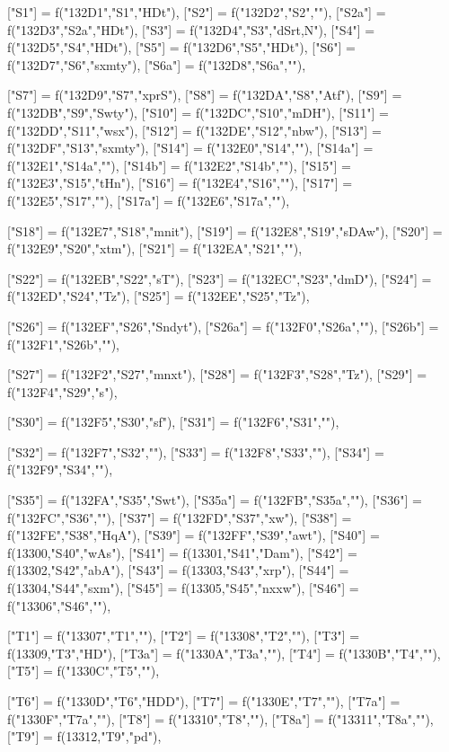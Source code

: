 \documentclass{article}
\begin{document}
\begin{luacode*}
{	["S1"] = f("132D1","S1","HDt"),
	["S2"] = f("132D2","S2",""),
	["S2a"] = f("132D3","S2a","HDt"),
	["S3"] = f("132D4","S3","dSrt,N"),
	["S4"] = f("132D5","S4","HDt"),
	["S5"] = f("132D6","S5","HDt"),
	["S6"] = f("132D7","S6","sxmty"),
	["S6a"] = f("132D8","S6a",""),


	["S7"] = f("132D9","S7","xprS"),
	["S8"] = f("132DA","S8","Atf"),
	["S9"] = f("132DB","S9","Swty"),
	["S10"] = f("132DC","S10","mDH"),
	["S11"] = f("132DD","S11","wsx"),
	["S12"] = f("132DE","S12","nbw"),
	["S13"] = f("132DF","S13","sxmty"),
	["S14"] = f("132E0","S14",""),
	["S14a"] = f("132E1","S14a",""),
	["S14b"] = f("132E2","S14b",""),
	["S15"] = f("132E3","S15","tHn"),
	["S16"] = f("132E4","S16",""),
	["S17"] = f("132E5","S17",""),
	["S17a"] = f("132E6","S17a",""),


	["S18"] = f("132E7","S18","mnit"),
	["S19"] = f("132E8","S19","sDAw"),
	["S20"] = f("132E9","S20","xtm"),
	["S21"] = f("132EA","S21",""),

	["S22"] = f("132EB","S22","sT"),
	["S23"] = f("132EC","S23","dmD"),
	["S24"] = f("132ED","S24","Tz"),
	["S25"] = f("132EE","S25","Tz"),

	["S26"] = f("132EF","S26","Sndyt"),
	["S26a"] = f("132F0","S26a",""),
	["S26b"] = f("132F1","S26b",""),

	["S27"] = f("132F2","S27","mnxt"),
	["S28"] = f("132F3","S28","Tz"),
	["S29"] = f("132F4","S29","s"),

	["S30"] = f("132F5","S30","sf"),
	["S31"] = f("132F6","S31",""),


	["S32"] = f("132F7","S32",""),
	["S33"] = f("132F8","S33",""),
	["S34"] = f("132F9","S34",""),


	["S35"] = f("132FA","S35","Swt"),
	["S35a"] = f("132FB","S35a",""),
	["S36"] = f("132FC","S36",""),
	["S37"] = f("132FD","S37","xw"),
	["S38"] = f("132FE","S38","HqA"),
	["S39"] = f("132FF","S39","awt"),
	["S40"] = f(13300,"S40","wAs"),
	["S41"] = f(13301,"S41","Dam"),
	["S42"] = f(13302,"S42","abA"),
	["S43"] = f(13303,"S43","xrp"),
	["S44"] = f(13304,"S44","sxm"),
	["S45"] = f(13305,"S45","nxxw"),
	["S46"] = f("13306","S46",""),

	["T1"] = f("13307","T1",""),
	["T2"] = f("13308","T2",""),
	["T3"] = f(13309,"T3","HD"),
	["T3a"] = f("1330A","T3a",""),
	["T4"] = f("1330B","T4",""),
	["T5"] = f("1330C","T5",""),

	["T6"] = f("1330D","T6","HDD"),
	["T7"] = f("1330E","T7",""),
	["T7a"] = f("1330F","T7a",""),
	["T8"] = f("13310","T8",""),
	["T8a"] = f("13311","T8a",""),
	["T9"] = f(13312,"T9","pd"),

}
\end{luacode*}
\end{document}
